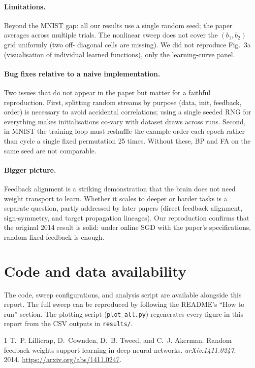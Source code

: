 \documentclass[11pt,a4paper]{article}
\begin{document}
\paragraph{Limitations.} Beyond the MNIST gap: all our results use a
single random seed; the paper averages across multiple trials. The
nonlinear sweep does not cover the $(b_1, b_2)$ grid uniformly (two off-
diagonal cells are missing). We did not reproduce Fig.\ 3a (visualisation
of individual learned functions), only the learning-curve panel.

\paragraph{Bug fixes relative to a naive implementation.} Two issues that
do not appear in the paper but matter for a faithful reproduction. First,
splitting random streams by purpose (data, init, feedback, order) is
necessary to avoid accidental correlations; using a single seeded RNG for
everything makes initialisations co-vary with dataset draws across runs.
Second, in MNIST the training loop must reshuffle the example order each
epoch rather than cycle a single fixed permutation 25 times. Without
these, BP and FA on the same seed are not comparable.

\paragraph{Bigger picture.} Feedback alignment is a striking
demonstration that the brain does not need weight transport to learn.
Whether it scales to deeper or harder tasks is a separate question, partly
addressed by later papers (direct feedback alignment, sign-symmetry, and
target propagation lineages). Our reproduction confirms that the original
2014 result is solid: under online SGD with the paper's specifications,
random fixed feedback is enough.

\section{Code and data availability}

The code, sweep configurations, and analysis script are available alongside
this report. The full sweep can be reproduced by following the README's
``How to run'' section. The
plotting script (\texttt{plot\_all.py}) regenerates every figure in this
report from the CSV outputs in \texttt{results/}.


\begin{thebibliography}{1}
T.~P. Lillicrap, D.~Cownden, D.~B. Tweed, and C.~J. Akerman.
\newblock Random feedback weights support learning in deep neural networks.
\newblock \emph{arXiv:1411.0247}, 2014.
\newblock \url{https://arxiv.org/abs/1411.0247}.
\end{thebibliography}
\end{document}
